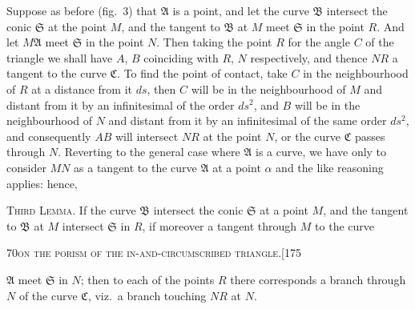 \documentclass[11pt]{article}
\begin{document}
Suppose as before (fig.~3) that $\mathfrak{A}$ is a point, and let the curve $\mathfrak{B}$ intersect the
conic $\mathfrak{S}$ at the point $M$, and the tangent to $\mathfrak{B}$ at $M$ meet $\mathfrak{S}$ in the point $R$. And let
$M\mathfrak{A}$ meet $\mathfrak{S}$ in the point $N$. Then taking the point $R$ for the angle $C$ of the
triangle we shall have $A$, $B$ coinciding with $R$, $N$ respectively, and thence $NR$ a tangent
to the curve $\mathfrak{C}$. To find the point of contact, take $C$ in the neighbourhood of $R$
at a distance from it $ds$, then $C$ will be in the neighbourhood of $M$ and distant
from it by an infinitesimal of the order $ds^{2}$, and $B$ will be in the neighbourhood
of $N$ and distant from it by an infinitesimal of the same order $ds^{2}$, and consequently
$AB$ will intersect $NR$ at the point $N$, or the curve $\mathfrak{C}$ passes through $N$. Reverting
to the general case where $\mathfrak{A}$ is a curve, we have only to consider $MN$ as a tangent
to the curve $\mathfrak{A}$ at a point $\alpha$ and the like reasoning applies: hence,

\textsc{Third Lemma.} If the curve $\mathfrak{B}$ intersect the conic $\mathfrak{S}$ at a point $M$, and the
tangent to $\mathfrak{B}$ at $M$ intersect $\mathfrak{S}$ in $R$, if moreover a tangent through $M$ to the curve

\newpage

\begin{center}
\small\textsc{70}\hfill\textsc{on the porism of the in-and-circumscribed triangle.}\hfill[175
\end{center}

\medskip

\noindent $\mathfrak{A}$ meet $\mathfrak{S}$ in $N$; then to each of the points $R$ there corresponds a branch through
$N$ of the curve $\mathfrak{C}$, viz.\ a branch touching $NR$ at $N$.
\end{document}
